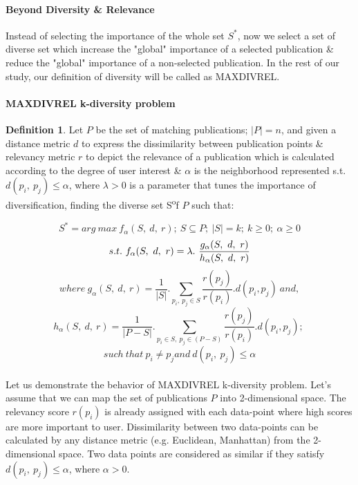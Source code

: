 \documentclass[a4paper,12pt,oneside]{book}
\theoremstyle{definition}
\newtheorem{definition}{Definition}[section]
\theoremstyle{remark}
\begin{document}
 
\paragraph{Beyond Diversity \& Relevance}
Instead of selecting the importance of the whole set $S^*$, now we select a set of diverse set which increase the "global" importance of a selected publication \& reduce the "global" importance of a non-selected publication. In the rest of our study, our definition of diversity will be called as MAXDIVREL.

\paragraph{MAXDIVREL k-diversity problem}
\begin{definition}
Let $P$ be the set of matching publications; $|P| = n$, and given a distance metric $d$ to express the dissimilarity between publication points \& relevancy metric $r$ to depict the relevance of a publication which is calculated according to the degree of user interest \& $\alpha$ is the neighborhood represented s.t. $d(p_i,\ p_j)\leq \alpha $, where $\lambda > 0$ is a parameter that tunes the importance of diversification, finding the diverse set S\textsuperscript* of $P$ such that:

\begin{center}
\[ S^* = arg\ max\ f_\alpha(S,\ d,\ r);\ S \subseteq P;\ |S| = k;\ k \geq 0;\ \alpha \geq 0 \]
\[s.t.\ f _\alpha(S,\ d,\ r) = \lambda.\ \frac{g _\alpha(S,\ d,\ r) \/ }{h _\alpha(S,\ d,\ r)} \]
\[where\ g _\alpha(S,\ d,\ r)=\frac{1}{|S|}.\sum_{p_i,\ p_j\in S} \frac{r(p_j)}{r(p_i)}.d(p_i,p_j)\ and,\]
\[h _\alpha(S,\ d,\ r)=\frac{1}{|P-S|}.\sum_{p_i\in S,\ p_j\in (P-S)} \frac{r(p_j)}{r(p_i)}.d(p_i,p_j);\ \]
\[such\ that \ p_{i} \neq p_{j} and\ d(p_i,\ p_j)\leq \alpha \]
\end{center}
\end{definition}

\paragraph*{}
Let us demonstrate the behavior of MAXDIVREL k-diversity problem. Let's assume that we can map the set of publications $P$ into 2-dimensional space. The relevancy score $r(p_i)$ is already assigned with each data-point where high scores are more important to user. Dissimilarity between two data-points can be calculated by any distance metric (e.g. Euclidean, Manhattan) from the 2-dimensional space. Two data points are considered as similar if they satisfy $d(p_i,\ p_j)\leq \alpha $, where $\alpha > 0$.
\end{document}
